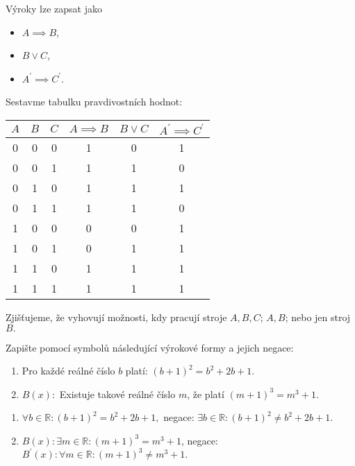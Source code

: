 \begin{reseni}
    Výroky lze zapsat jako
    \begin{itemize}
    \item $A\implies B$,
   	\item $B\lor C$,
   	\item $A^\prime \implies C^\prime$.
    \end{itemize}
    Sestavme tabulku pravdivostních hodnot:
    \begin{center}
      \begin{tabular}{c c c | c c c }
        $A$ & $B$ & $C$ & $A \implies B$ & $B \lor C$ & $A^\prime \implies C^\prime$ \\
        \hline
        0 & 0 & 0 & 1 & 0 & 1  \\
        0 & 0 & 1 & 1 & 1 & 0  \\
        0 & 1 & 0 & 1 & 1 & 1  \\
        0 & 1 & 1 & 1 & 1 & 0  \\
        1 & 0 & 0 & 0 & 0 & 1  \\
        1 & 0 & 1 & 0 & 1 & 1  \\
        1 & 1 & 0 & 1 & 1 & 1  \\
        1 & 1 & 1 & 1 & 1 & 1  \\
      \end{tabular}
    \end{center}
    Zjišťujeme, že vyhovují možnosti, kdy pracují
    stroje $A,B,C$; $A,B$; nebo jen stroj $B.$
\end{reseni}

\begin{priklad}
    Zapište pomocí symbolů následující výrokové formy a jejich negace:
    \begin{enumerate}[$a.$]
    \item Pro každé reálné číslo $b$ platí: $(b+1)^2=b^2+2b+1.$
   	\item $B(x):$ Existuje takové reálné číslo $m$, že platí $(m+1)^3=m^3+1$.
    \end{enumerate}
\end{priklad}

\begin{reseni}
\begin{enumerate}[$a.$]
\item $\forall b \in \mathbb R: (b+1)^2=b^2+2b+1,$ negace: $\exists b \in \mathbb R:  (b+1)^2\ne b^2+2b+1.$
\item $B(x): \exists m \in \mathbb R: (m+1)^3=m^3+1$, negace: $B^\prime(x): \forall m \in \mathbb R: (m+1)^3\ne m^3+1.$
\end{enumerate}
\end{reseni}

